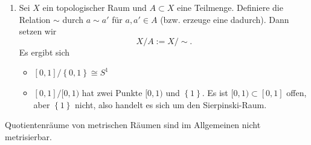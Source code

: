 \begin{example}
\begin{enumerate}[1)]
\[            .\] 
            Dies sehen wir mittels folgendem Diagramm:
            \begin{equation}
            \begin{tikzcd}
                \R^{n+1} \setminus \left \{0\right\}  \ar[two heads]{d} \ar[shift left]{r}{f} & S^n \ar[shift left]{l}{ι} \ar[two heads]{d} \\
                \R P^n \ar[dashed, shift left]{r}{\overline{f}} & S^n / (x \sim  - x) \ar[dashed, shift left]{l}{\overline{ι}}
            \end{tikzcd}
            \end{equation}
            Die Abbildungen $\overline{ι}$ und $\overline{f}$ sind stetig nach der universellen Eigenschaft und invers zueinander. \\
            \begin{minipage}{\textwidth}
                \centering
{}
            \end{minipage}
            \\ 
        \item Sei $X$ ein topologischer Raum und  $A\subset X$ eine Teilmenge. Definiere die Relation $\sim $ durch $a\sim a'$ für $a,a'\in A$ (bzw. erzeuge eine dadurch). Dann setzen wir
            \[
            X / A := X / \sim 
            .\] 
            Es ergibt sich
            \begin{itemize}
                \item $[0,1] / \left \{0,1\right\} \cong S^1$ 
                \item $[0,1] / [0,1)$ hat zwei Punkte  $[0,1)$ und  $\left \{1\right\} $. Es ist $[0,1) \subset [0,1]$ offen, aber $\left \{1\right\} $ nicht, also handelt es sich um den Sierpinski-Raum.
            \end{itemize}
    \end{enumerate}
\end{example}
\begin{remark}
    Quotientenräume von metrischen Räumen sind im Allgemeinen nicht metrisierbar.
\end{remark}




